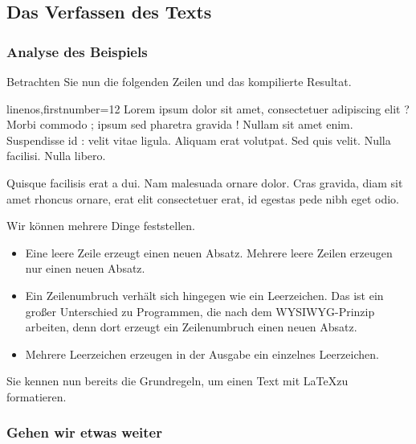 \subsection{Das Verfassen des Texts}

\subsubsection{Analyse des Beispiels}
Betrachten Sie nun die folgenden Zeilen und das kompilierte Resultat.


\begin{latexcode*}{linenos,firstnumber=12}
Lorem ipsum dolor sit amet, consectetuer adipiscing elit ?
Morbi commodo ; ipsum sed pharetra gravida !
Nullam sit amet enim. Suspendisse id : velit vitae ligula.
Aliquam erat volutpat.
Sed quis velit. Nulla facilisi. Nulla libero. 

Quisque facilisis erat a dui.
Nam malesuada ornare dolor.
Cras gravida, diam sit amet rhoncus ornare, 
erat      elit consectetuer erat, id egestas pede nibh eget odio.
\end{latexcode*}


Wir können mehrere Dinge feststellen.
\begin{itemize}
\item Eine leere Zeile erzeugt einen neuen Absatz. Mehrere leere Zeilen erzeugen nur einen neuen Absatz.
\item Ein Zeilenumbruch verhält sich hingegen wie ein Leerzeichen. Das ist ein großer Unterschied zu Programmen, die nach dem WYSIWYG-Prinzip arbeiten, denn dort erzeugt ein Zeilenumbruch einen neuen Absatz.
\item Mehrere Leerzeichen erzeugen in der Ausgabe ein einzelnes Leerzeichen. 
\end{itemize}

Sie kennen nun bereits die Grundregeln, um einen Text mit \LaTeX zu formatieren.

\subsubsection{Gehen wir etwas weiter}%

